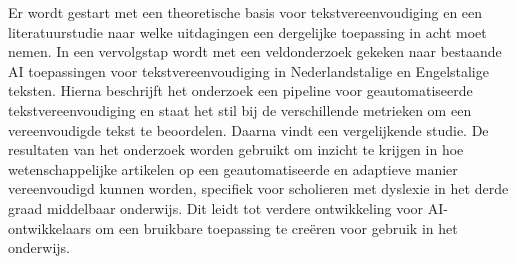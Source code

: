 Er wordt gestart met een theoretische basis voor tekstvereenvoudiging en een literatuurstudie naar welke uitdagingen een dergelijke toepassing in acht moet nemen. In een vervolgstap wordt met een veldonderzoek gekeken naar bestaande AI toepassingen voor tekstvereenvoudiging in Nederlandstalige en Engelstalige teksten. Hierna beschrijft het onderzoek een pipeline voor geautomatiseerde tekstvereenvoudiging en staat het stil bij de verschillende metrieken om een vereenvoudigde tekst te beoordelen. Daarna vindt een vergelijkende studie. De resultaten van het onderzoek worden gebruikt om inzicht te krijgen in hoe wetenschappelijke artikelen op een geautomatiseerde en adaptieve manier vereenvoudigd kunnen worden, specifiek voor scholieren met dyslexie in het derde graad middelbaar onderwijs. Dit leidt tot verdere ontwikkeling voor AI-ontwikkelaars om een bruikbare toepassing te creëren voor gebruik in het onderwijs.




